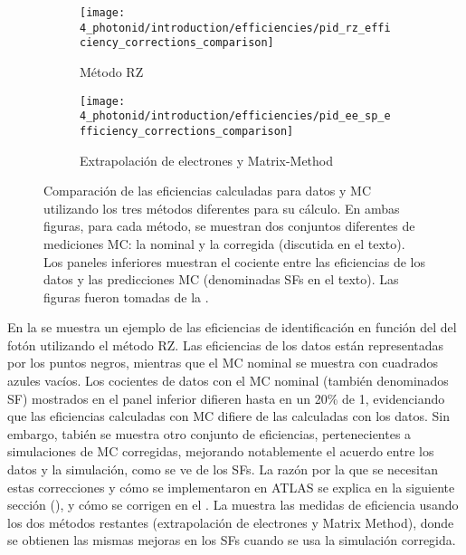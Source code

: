 \begin{figure}[ht!]
    \centering
    \begin{subfigure}[h]{0.49\linewidth}
        \centering
        \texttt{[image: 4\_photonid/introduction/efficiencies/pid\_rz\_efficiency\_corrections\_comparison]}
        \caption{Método \acf{RZ}}
        \label{fig:pid_ss:pid:efficiencies:efficiencies_old:rz}
    \end{subfigure}
    \hfill
    \begin{subfigure}[h]{0.49\linewidth}
        \centering
        \texttt{[image: 4\_photonid/introduction/efficiencies/pid\_ee\_sp\_efficiency\_corrections\_comparison]}
        \caption{Extrapolación de electrones y Matrix-Method}
        \label{fig:pid_ss:pid:efficiencies:efficiencies_old:ee_sp}
    \end{subfigure}
    \caption{Comparación de las eficiencias calculadas para datos y \ac{MC} utilizando los tres métodos diferentes para su cálculo. En ambas figuras, para cada método, se muestran dos conjuntos diferentes de mediciones \ac{MC}: la nominal y la corregida (discutida en el texto). Los paneles inferiores muestran el cociente entre las eficiencias de los datos y las predicciones \ac{MC} (denominadas \acfp{SF} en el texto). Las figuras fueron tomadas de la .}
    \label{fig:pid_ss:pid:efficiencies:efficiencies_old}
\end{figure}


En la \Fig{\ref{fig:pid_ss:pid:efficiencies:efficiencies_old:rz}} se muestra un ejemplo de las eficiencias de identificación en función del \pt del fotón utilizando el método \ac{RZ}. Las eficiencias de los datos están representadas por los puntos negros, mientras que el \ac{MC} nominal se muestra con cuadrados azules vacíos. Los cocientes de datos con el \ac{MC} nominal (también denominados \acf{SF}) mostrados en el panel inferior difieren hasta en un 20\% de 1, evidenciando que las eficiencias calculadas con \ac{MC} difiere de las calculadas con los datos. Sin embargo, tabién se muestra otro conjunto de eficiencias, pertenecientes a simulaciones de \ac{MC} corregidas, mejorando notablemente el acuerdo entre los datos y la simulación, como se ve de los \acp{SF}. La razón por la que se necesitan estas correcciones y cómo se implementaron en \ac{ATLAS} se explica en la siguiente sección (\Sect{\ref{sec:pid_ss:ss_differences}}), y cómo se corrigen en el \Ch{\ref{ch:ss_corrections}}. La \Fig{\ref{fig:pid_ss:pid:efficiencies:efficiencies_old:ee_sp}} muestra las medidas de eficiencia usando los dos métodos restantes (extrapolación de electrones y Matrix Method), donde se obtienen las mismas mejoras en los \acp{SF} cuando se usa la simulación corregida.

